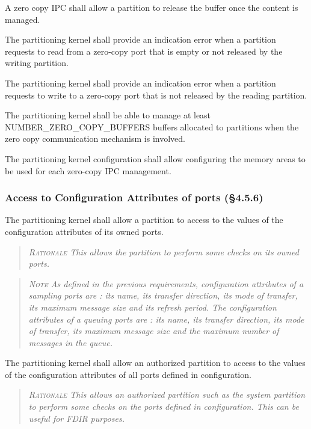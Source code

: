 A zero copy IPC shall allow a partition to release the buffer once the content is managed.

The partitioning kernel shall provide an indication error when a partition requests to read from a zero-copy port that is empty or not released by the writing partition.

The partitioning kernel shall provide an indication error when a partition requests to write to a zero-copy port that is not released by the reading partition.

The partitioning kernel shall be able to manage at least NUMBER\_ZERO\_COPY\_BUFFERS buffers allocated to partitions when the zero copy communication mechanism is involved.

The partitioning kernel configuration shall allow configuring the memory areas to be used for each zero-copy IPC management.

\subsubsection{Access to Configuration Attributes of ports (\S4.5.6)}

The partitioning kernel shall allow a partition to access to the values of the configuration attributes of its owned ports.
\begin{quote}\it
\textsc{Rationale}
This allows the partition to perform some checks on its owned ports.
\end{quote}
\begin{quote}\it
\textsc{Note}
As defined in the previous requirements, configuration attributes of a sampling ports are : its name, its transfer direction, its mode of transfer, its maximum message size and its refresh period.
The configuration attributes of a queuing ports are :  its name, its transfer direction, its mode of transfer, its maximum message size and the maximum number of messages in the queue.
\end{quote}

The partitioning kernel shall allow an authorized partition to access to the values of the configuration attributes of all ports defined in configuration.
\begin{quote}\it
\textsc{Rationale}
This allows an authorized partition such as the  system partition to perform some checks on the ports defined in configuration. This can be useful for FDIR purposes.
\end{quote}

